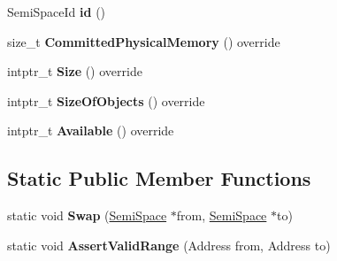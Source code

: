 \begin{DoxyCompactItemize}
\item 
Semi\+Space\+Id {\bfseries id} ()\hypertarget{classv8_1_1internal_1_1_semi_space_acdc44c71f23654cb7a127db798a1a52a}{}\label{classv8_1_1internal_1_1_semi_space_acdc44c71f23654cb7a127db798a1a52a}

\item 
size\+\_\+t {\bfseries Committed\+Physical\+Memory} () override\hypertarget{classv8_1_1internal_1_1_semi_space_a0f0477f262aa4c64a4f19bdd7d9807ca}{}\label{classv8_1_1internal_1_1_semi_space_a0f0477f262aa4c64a4f19bdd7d9807ca}

\item 
intptr\+\_\+t {\bfseries Size} () override\hypertarget{classv8_1_1internal_1_1_semi_space_a57ad5dfdcbadb76b4b356f3eef9160a5}{}\label{classv8_1_1internal_1_1_semi_space_a57ad5dfdcbadb76b4b356f3eef9160a5}

\item 
intptr\+\_\+t {\bfseries Size\+Of\+Objects} () override\hypertarget{classv8_1_1internal_1_1_semi_space_a8b0b2982a5dda0705c0f80104c686840}{}\label{classv8_1_1internal_1_1_semi_space_a8b0b2982a5dda0705c0f80104c686840}

\item 
intptr\+\_\+t {\bfseries Available} () override\hypertarget{classv8_1_1internal_1_1_semi_space_a09b86b020090c3eb7d8f81963f2c0645}{}\label{classv8_1_1internal_1_1_semi_space_a09b86b020090c3eb7d8f81963f2c0645}

\end{DoxyCompactItemize}
\subsection*{Static Public Member Functions}
\begin{DoxyCompactItemize}
\item 
static void {\bfseries Swap} (\hyperlink{classv8_1_1internal_1_1_semi_space}{Semi\+Space} $\ast$from, \hyperlink{classv8_1_1internal_1_1_semi_space}{Semi\+Space} $\ast$to)\hypertarget{classv8_1_1internal_1_1_semi_space_a12d9024e40c876221b1fc8da9ad55433}{}\label{classv8_1_1internal_1_1_semi_space_a12d9024e40c876221b1fc8da9ad55433}

\item 
static void {\bfseries Assert\+Valid\+Range} (Address from, Address to)\hypertarget{classv8_1_1internal_1_1_semi_space_ae78e80586c1013a2339790bd6f5938e2}{}\label{classv8_1_1internal_1_1_semi_space_ae78e80586c1013a2339790bd6f5938e2}

\end{DoxyCompactItemize}
